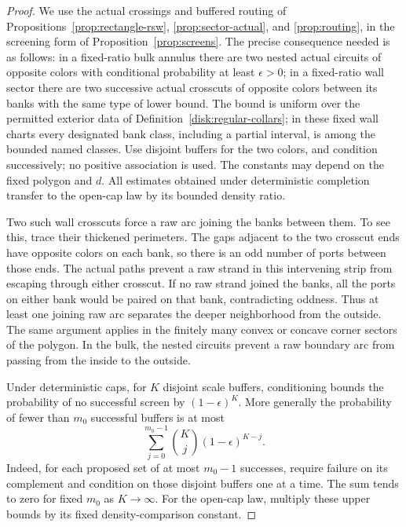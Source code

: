 \begin{proof}
We use the actual crossings and buffered routing of
Propositions~\ref{prop:rectangle-rsw}, \ref{prop:sector-actual},
and \ref{prop:routing}, in the screening form of
Proposition~\ref{prop:screens}.  The precise consequence needed is
as follows: in a fixed-ratio bulk annulus there are two nested
actual circuits of opposite colors with conditional probability
at least $\epsilon>0$; in a fixed-ratio wall sector there are two
successive actual crosscuts of opposite colors between its banks
with the same type of lower bound.  The bound is uniform over the
permitted exterior data of Definition~\ref{disk:regular-collars};
in these fixed wall charts every designated bank class, including
a partial interval, is among the bounded named classes.  Use disjoint
buffers for the two colors, and condition successively; no positive association is
used.  The constants may depend on the fixed polygon and $d$.
All estimates obtained under deterministic completion transfer to
the open-cap law by its bounded density ratio.

Two such wall crosscuts force a raw arc joining the banks between
them.  To see this, trace their thickened perimeters.  The gaps
adjacent to the two crosscut ends have opposite colors on each
bank, so there is an odd number of ports between those ends.
The actual paths prevent a raw strand in this intervening strip
from escaping through either crosscut.  If no raw strand joined
the banks, all the ports on either bank would be paired on that
bank, contradicting oddness.  Thus at least one joining raw arc
separates the deeper neighborhood from the outside.  The same
argument applies in the finitely many convex or concave corner
sectors of the polygon.  In the bulk, the nested circuits prevent
a raw boundary arc from passing from the inside to the outside.

Under deterministic caps, for $K$ disjoint scale buffers, conditioning bounds the
probability of no successful screen by $(1-\epsilon)^K$.
More generally the probability of fewer than $m_0$ successful
buffers is at most
\begin{equation}
 \sum_{j=0}^{m_0-1}\binom Kj(1-\epsilon)^{K-j}.
 \label{obs:screen-tail}
\end{equation}
Indeed, for each proposed set of at most $m_0-1$ successes, require
failure on its complement and condition on those disjoint buffers
one at a time.  The sum tends to zero for fixed $m_0$ as $K\to\infty$.
For the open-cap law, multiply these upper bounds by its fixed
density-comparison constant.


\end{proof}
